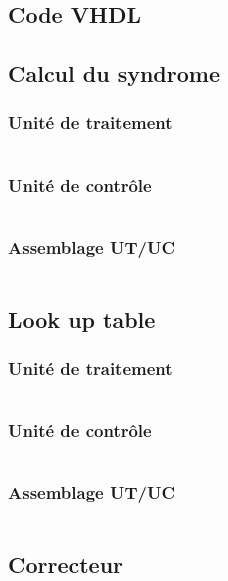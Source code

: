 \documentclass[a4paper, 11pt, svgnames]{report}
\begin{document}
    \begin{appendices}

        \chapter{Code VHDL}

        \section{Calcul du syndrome}
        \label{ann:vhdl_syndrome}
        \subsection{Unité de traitement}
        \inputminted[firstline=0, lastline=51,breaklines]{VHDL}{../src/ut_syndrome.vhd}
        \subsection{Unité de contrôle}
        \inputminted[firstline=0, lastline=81,breaklines]{VHDL}{../src/uc_syndrome.vhd}
        \subsection{Assemblage UT/UC}
        \inputminted[firstline=0, lastline=44,breaklines]{VHDL}{../src/syndrome.vhd}

        \section{Look up table}
        \label{ann:vhdl_lut}
        \subsection{Unité de traitement}
        \inputminted[firstline=0, lastline=84,breaklines]{VHDL}{../src/ut_lut.vhd}
        \subsection{Unité de contrôle}
        \inputminted[firstline=0, lastline=72,breaklines]{VHDL}{../src/uc_lut.vhd}
        \subsection{Assemblage UT/UC}
        \inputminted[firstline=0, lastline=90,breaklines]{VHDL}{../src/lut.vhd}

        \section{Correcteur}
        \label{ann:vhdl_correcteur}

\end{appendices}
\end{document}
